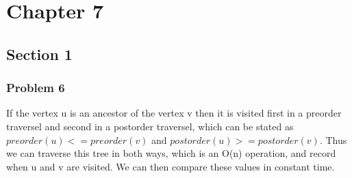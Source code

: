 \documentclass{article}
\begin{document}
\section{Chapter 7}
  \subsection{Section 1}
    \subsubsection{Problem 6}
      If the vertex u is an ancestor of the vertex v then
      it is visited first in a preorder traversel and second in a postorder traversel,
      which can be stated as $preorder(u) <= preorder(v)$ and $postorder(u) >= postorder(v)$.
      Thus we can traverse this tree in both ways, which is an O(n) operation, and record when u and v are visited.
      We can then compare these values in constant time.
\end{document}
